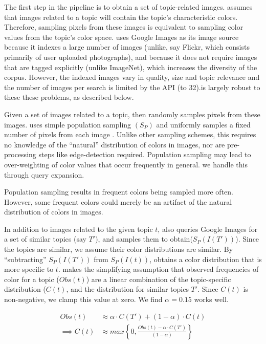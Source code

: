 
The first step in the \system pipeline is to obtain a set of topic-related images. \system assumes that images related to a topic will contain the topic's characteristic colors. Therefore, sampling pixels from these images is equivalent to sampling color values from the topic's color space. \system uses Google Images as its image source because it indexes a large number of images  (unlike, say Flickr, which consists primarily of user uploaded photographs), and because it does not require images that are tagged explicitly (unlike ImageNet), which increases the diversity of the corpus. However, the indexed images vary in quality, size and topic relevance and the number of images per search is limited by the API (to 32).\system is largely robust to these these problems, as described below. 

Given a set of images related to a topic, \system then randomly samples pixels from these images. \system uses simple population sampling $(S_{P})$ and uniformly samples a fixed number of pixels from each image . Unlike other sampling schemes, this requires no knowledge of the ``natural'' distribution of colors in images, nor are pre-processing steps like edge-detection required. Population sampling may lead to over-weighting of color values that occur frequently in general. we handle this through query expansion.

Population sampling results in frequent colors being sampled more often. However, some frequent colors could merely be an artifact of the natural distribution of colors in images. 

In addition to images related to the given topic $t$, \system also queries Google Images for a set of similar topics (say $T'$), and samples them to obtain($S_{P}(I(T'))$). Since the topics are similar, we assume their color distributions are similar. By ``subtracting'' $S_{P}(I(T'))$ from $S_{P}(I(t))$, \system obtains a color distribution that is more specific to $t$. \system makes the simplifying assumption that observed frequencies of color for a topic ($Obs(t)$) are a linear combination of the topic-specific distribution ($C(t)$, and the distribution for similar topics $T'$. Since $C(t)$ is non-negative, we clamp this value at zero. We find $\alpha = 0.15$ works well.

\begin{align}
Obs(t) &\approx \alpha\cdot C(T') + (1-\alpha)\cdot C(t) \\
\label{linear-color}
\implies  C(t) &\approx max\left\{0,\frac{Obs(t) - \alpha\cdot C(T')}{(1-\alpha)}\right\}
\end{align}


